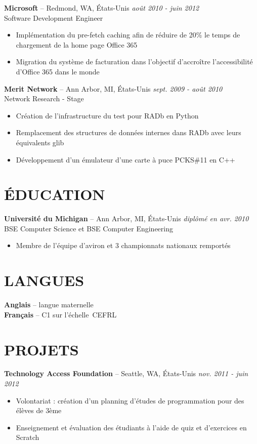 \documentclass[]{rob-keim-resume}
\begin{document}
	{\bf Microsoft} --  Redmond, WA, États-Unis \hfill {\sl août 2010 - juin 2012} \\
	Software Development Engineer
	\begin{itemize} \itemsep -2pt
		\item Implémentation du pre-fetch caching afin de réduire de 20\% le temps de chargement de la home page Office 365
		\item Migration du système de facturation dans l’objectif d’accroître l’accessibilité d’Office 365 dans le monde
	\end{itemize}
	
	{\bf Merit Network} --  Ann Arbor, MI, États-Unis \hfill {\sl sept. 2009 - août 2010} \\
	Network Research - Stage
	\begin{itemize} \itemsep -2pt
		\item Création de l’infrastructure du test pour RADb en Python
		\item Remplacement des structures de données internes dans RADb avec leurs équivalents glib
		\item Développement d’un émulateur d’une carte à puce PCKS\#11 en C++
	\end{itemize}
	
	\section{ÉDUCATION} 
	
	{\bf Université du Michigan} -- Ann Arbor, MI, États-Unis \hfill {\sl diplômé en avr. 2010} \\
	BSE Computer Science et BSE Computer Engineering
	\begin{itemize} \itemsep -2pt
		\item Membre de l’équipe d’aviron et 3 championnats nationaux remportés
	\end{itemize}
	
	\section{LANGUES}
	
	{\bf Anglais} -- langue maternelle \\
	{\bf Français} -- C1 sur l'échelle\ CEFRL
	
	\section{PROJETS}
	
	{\bf Technology Access Foundation} --  Seattle, WA, États-Unis \hfill {\sl nov. 2011 - juin 2012} 
	\begin{itemize} \itemsep -2pt
		\item Volontariat : création d'un planning d’études de programmation pour des élèves de 3ème
		\item Enseignement et évaluation des étudiants à l'aide de quiz et d'exercices en Scratch
	\end{itemize}
\end{document}
